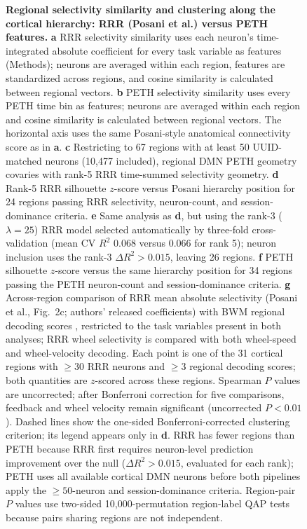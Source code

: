 \begin{figure}
\begin{fullwidth}
\caption{\textbf{Regional selectivity similarity and clustering along the cortical hierarchy: RRR (Posani et al.) versus PETH features.}
\textbf{a} RRR selectivity similarity \cite{posani2026rarely} uses each neuron's time-integrated absolute coefficient for every task variable as features (Methods); neurons are averaged within each region, features are standardized across regions, and cosine similarity is calculated between regional vectors.
\textbf{b} PETH selectivity similarity uses every PETH time bin as features; neurons are averaged within each region and cosine similarity is calculated between regional vectors. The horizontal axis uses the same Posani-style anatomical connectivity score as in \textbf{a}.
\textbf{c} Restricting to 67 regions with at least 50 UUID-matched neurons (10,477 included), regional DMN PETH geometry covaries with rank-5 RRR time-summed selectivity geometry.
\textbf{d} Rank-5 RRR silhouette $z$-score versus Posani hierarchy position \cite{harris2019hierarchical} for 24 regions passing RRR selectivity, neuron-count, and session-dominance criteria.
\textbf{e} Same analysis as \textbf{d}, but using the rank-3 ($\lambda=25$) RRR model selected automatically by three-fold cross-validation (mean CV $R^2$ 0.068 versus 0.066 for rank 5); neuron inclusion uses the rank-3 $\Delta R^2>0.015$, leaving 26 regions.
\textbf{f} PETH silhouette $z$-score versus the same hierarchy position for 34 regions passing the PETH neuron-count and session-dominance criteria.
\textbf{g} Across-region comparison of RRR mean absolute selectivity (Posani et al., Fig.~2c; authors' released coefficients) with BWM regional decoding scores \cite{international2025brain}, restricted to the task variables present in both analyses; RRR wheel selectivity is compared with both wheel-speed and wheel-velocity decoding. Each point is one of the 31 cortical regions with $\geq30$ RRR neurons and $\geq3$ regional decoding scores; both quantities are $z$-scored across these regions. Spearman $P$ values are uncorrected; after Bonferroni correction for five comparisons, feedback and wheel velocity remain significant (uncorrected $P<0.01$).
Dashed lines show the one-sided Bonferroni-corrected clustering criterion; its legend appears only in \textbf{d}. RRR has fewer regions than PETH because RRR first requires neuron-level prediction improvement over the null ($\Delta R^2>0.015$, evaluated for each rank); PETH uses all available cortical DMN neurons before both pipelines apply the $\geq50$-neuron and session-dominance criteria. Region-pair $P$ values use two-sided 10,000-permutation region-label QAP tests because pairs sharing regions are not independent.
\label{fig:rrr_peth_selectivity_comparison}
}
\end{fullwidth}
\end{figure}

